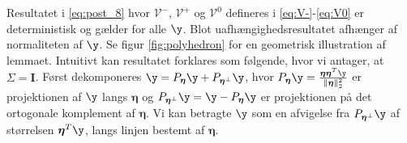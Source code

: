 Resultatet i \eqref{eq:post_8} hvor \(\mathcal{V}^-\), \(\mathcal{V}^+\) og \(\mathcal{V}^0\) defineres i \eqref{eq:V-}-\eqref{eq:V0} er deterministisk og gælder for alle \(\y\).
Blot uafhængighedsresultatet afhænger af normaliteten af \(\y\).
Se figur \ref{fig:polyhedron} for en geometrisk illustration af lemmaet.
Intuitivt kan resultatet forklares som følgende, hvor vi antager, at \(\Sigma= \mathbf{I}\).
Først dekomponeres \(\y=P_{\boldsymbol{\eta}} \y + P_{\boldsymbol{\eta}^\perp} \y\), hvor \(P_{\boldsymbol{\eta}} \y = \frac{\boldsymbol{\eta} \boldsymbol{\eta}^T \y}{\Vert \boldsymbol{\eta} \Vert_2^2}\) er projektionen af \(\y\) langs \(\boldsymbol{\eta}\) og \(P_{\boldsymbol{\eta}^\perp} \y = \y - P_{\boldsymbol{\eta}} \y\) er projektionen på det ortogonale komplement af \(\boldsymbol{\eta}\).
Vi kan betragte \(\y\) som en afvigelse fra \(P_{\boldsymbol{\eta}^\perp} \y\) af størrelsen \(\boldsymbol{\eta}^T \y\), langs linjen bestemt af \(\boldsymbol{\eta}\).
